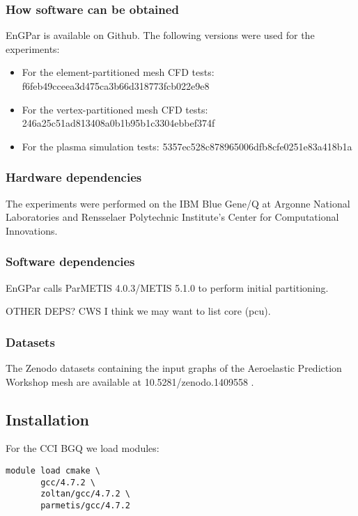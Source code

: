 \subsubsection{How software can be obtained}

EnGPar is available on Github.  The following versions were used for the
experiments:

\begin{itemize}
\item For the element-partitioned mesh CFD tests: f6feb49cceea3d475ca3b66d318773fcb022e9e8
\item For the vertex-partitioned mesh CFD tests: 246a25c51ad813408a0b1b95b1c3304ebbef374f
\item For the plasma simulation tests: 5357ec528c878965006dfb8cfe0251e83a418b1a
\end{itemize}

\subsubsection{Hardware dependencies}

The experiments were performed on the IBM Blue Gene/Q at Argonne National
Laboratories and Rensselaer Polytechnic Institute's Center for Computational
Innovations.

\subsubsection{Software dependencies}

EnGPar calls ParMETIS 4.0.3/METIS 5.1.0 to perform initial partitioning.

{\color{red} OTHER DEPS? CWS I think we may want to list core (pcu).}

\subsubsection{Datasets}

The Zenodo datasets containing the input graphs of the Aeroelastic Prediction
Workshop mesh are available at 10.5281/zenodo.1409558 .

\subsection{Installation}

For the CCI BGQ we load modules:
\begin{lstlisting}
module load cmake \
       gcc/4.7.2 \
       zoltan/gcc/4.7.2 \
       parmetis/gcc/4.7.2
\end{lstlisting}

